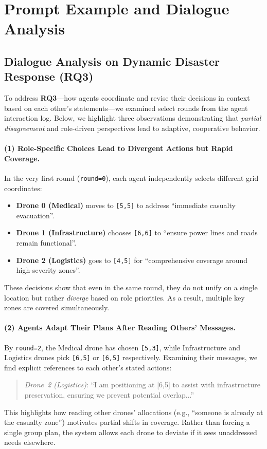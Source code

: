 \section{Prompt Example and Dialogue Analysis}
\label{sec:appendix:d}

\subsection{Dialogue Analysis on Dynamic Disaster Response (RQ3)}
\label{sec:analysis-rq3}

To address \textbf{RQ3}---how agents coordinate and revise their decisions in context based on each other’s statements---we examined select rounds from the agent interaction log. Below, we highlight three observations demonstrating that \emph{partial disagreement} and role-driven perspectives lead to adaptive, cooperative behavior.

\paragraph{(1) Role-Specific Choices Lead to Divergent Actions but Rapid Coverage.}
In the very first round (\texttt{round=0}), each agent independently selects different grid coordinates:
\begin{itemize} [itemsep=1pt, parsep=1pt, leftmargin=*]
    \item \textbf{Drone 0 (Medical)} moves to \texttt{[5,5]} to address ``immediate casualty evacuation''.
    \item \textbf{Drone 1 (Infrastructure)} chooses \texttt{[6,6]} to ``ensure power lines and roads remain functional''.
    \item \textbf{Drone 2 (Logistics)} goes to \texttt{[4,5]} for ``comprehensive coverage around high-severity zones''.
\end{itemize}
These decisions show that even in the same round, they do not unify on a single location but rather \emph{diverge} based on role priorities. As a result, multiple key zones are covered simultaneously. 

\paragraph{(2) Agents Adapt Their Plans After Reading Others’ Messages.}
By \texttt{round=2}, the Medical drone has chosen \texttt{[5,3]}, while Infrastructure and Logistics drones pick \texttt{[6,5]} or \texttt{[6,5]} respectively. Examining their messages, we find explicit references to each other’s stated actions:
\begin{quote}
\emph{Drone~2 (Logistics)}: ``I am positioning at [6,5] to assist with infrastructure preservation, ensuring we prevent potential overlap...''
\end{quote}
This highlights how reading other drones’ allocations (e.g., “someone is already at the casualty zone”) motivates partial shifts in coverage. Rather than forcing a single group plan, the system allows each drone to deviate if it sees unaddressed needs elsewhere.

